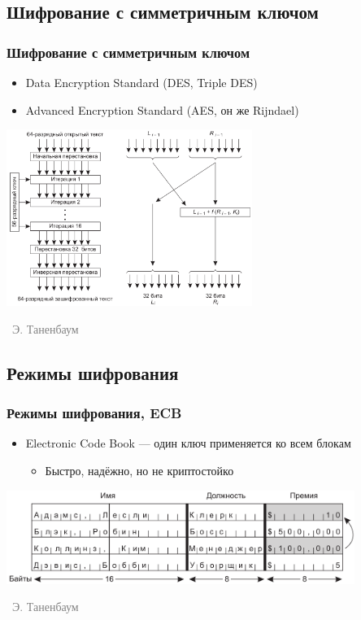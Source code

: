 \documentclass[xetex,mathserif,serif]{beamer}
\newcommand{\attribution}[1] {
\vspace{-5mm}\begin{flushright}\begin{scriptsize}\textcolor{gray}{\textcopyright\, #1}\end{scriptsize}\end{flushright}
}
\begin{document}
	\subsection{Шифрование с симметричным ключом}

	\begin{frame}
		\frametitle{Шифрование с симметричным ключом}
		\begin{itemize}
			\item Data Encryption Standard (DES, Triple DES)
			\item Advanced Encryption Standard (AES, он же Rijndael)
		\end{itemize}
		\begin{center}
			\includegraphics[width=0.6\textwidth]{des.png}
			\attribution{Э. Таненбаум}
		\end{center}
	\end{frame}

	\subsection{Режимы шифрования}

	\begin{frame}
		\frametitle{Режимы шифрования, ECB}
		\begin{itemize}
			\item Electronic Code Book --- один ключ применяется ко всем блокам
			\begin{itemize}
				\item Быстро, надёжно, но не криптостойко
			\end{itemize}
		\end{itemize}
		\begin{center}
			\includegraphics[width=0.85\textwidth]{ecbAttack.png}
			\attribution{Э. Таненбаум}
		\end{center}
	\end{frame}
\end{document}
